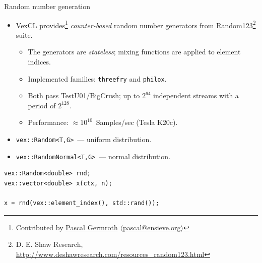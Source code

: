\documentclass[@BEAMER_OPTIONS@]{beamer}
\newcommand{\code}[1]{\lstinline|#1|}
\begin{document}
\begin{frame}[fragile]{Random number generation}
    \begin{itemize}
        \item VexCL provides\footnote{Contributed by
            \href{https://github.com/neapel}{Pascal Germroth}
            $\langle$\href{mailto:pascal@ensieve.org}{pascal@ensieve.org}$\rangle$}
            \emph{counter-based} random number generators from
            Random123\footnote{D. E. Shaw Research,
                \href{http://www.deshawresearch.com/resources\_random123.html}{http://www.deshawresearch.com/resources\_random123.html}}
            suite.
            \begin{itemize}
                \item The generators are \emph{stateless}; mixing functions are
                    applied to element indices.
                \item Implemented families: \code{threefry} and \code{philox}.
                \item Both pass TestU01/BigCrush; up to \alert{$2^{64}$}
                    independent streams with a period of \alert{$2^{128}$}.
                \item Performance: \alert{$\approx 10^{10}$}~Samples/sec (Tesla
                    K20c).
            \end{itemize}
        \item \code{vex::Random<T,G>}~--- uniform distribution.
        \item \code{vex::RandomNormal<T,G>}~--- normal distribution.
    \end{itemize}
    \begin{exampleblock}{}
        \begin{lstlisting}
vex::Random<double> rnd;
vex::vector<double> x(ctx, n);

x = rnd(vex::element_index(), std::rand());
        \end{lstlisting}
    \end{exampleblock}
\end{frame}

\end{document}
